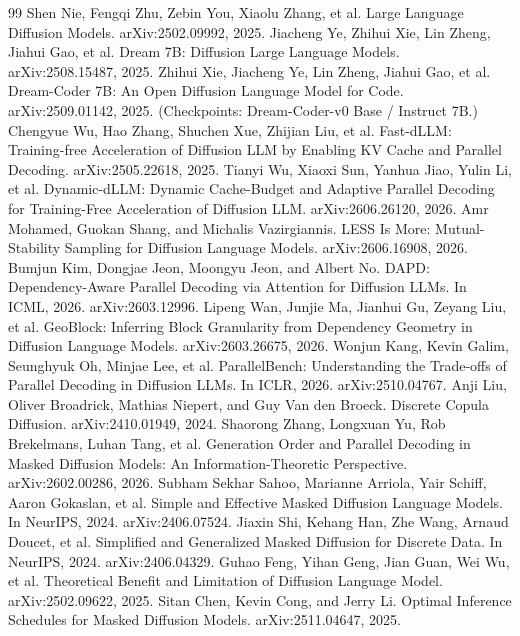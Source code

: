 \begin{thebibliography}{99}
\small
{} Shen Nie, Fengqi Zhu, Zebin You, Xiaolu Zhang, et al. Large Language Diffusion Models. arXiv:2502.09992, 2025.
 Jiacheng Ye, Zhihui Xie, Lin Zheng, Jiahui Gao, et al. Dream 7B: Diffusion Large Language Models. arXiv:2508.15487, 2025.
 Zhihui Xie, Jiacheng Ye, Lin Zheng, Jiahui Gao, et al. Dream-Coder 7B: An Open Diffusion Language Model for Code. arXiv:2509.01142, 2025. (Checkpoints: Dream-Coder-v0 Base / Instruct 7B.)
 Chengyue Wu, Hao Zhang, Shuchen Xue, Zhijian Liu, et al. Fast-dLLM: Training-free Acceleration of Diffusion LLM by Enabling KV Cache and Parallel Decoding. arXiv:2505.22618, 2025.
 Tianyi Wu, Xiaoxi Sun, Yanhua Jiao, Yulin Li, et al. Dynamic-dLLM: Dynamic Cache-Budget and Adaptive Parallel Decoding for Training-Free Acceleration of Diffusion LLM. arXiv:2606.26120, 2026.
 Amr Mohamed, Guokan Shang, and Michalis Vazirgiannis. LESS Is More: Mutual-Stability Sampling for Diffusion Language Models. arXiv:2606.16908, 2026.
 Bumjun Kim, Dongjae Jeon, Moongyu Jeon, and Albert No. DAPD: Dependency-Aware Parallel Decoding via Attention for Diffusion LLMs. In ICML, 2026. arXiv:2603.12996.
 Lipeng Wan, Junjie Ma, Jianhui Gu, Zeyang Liu, et al. GeoBlock: Inferring Block Granularity from Dependency Geometry in Diffusion Language Models. arXiv:2603.26675, 2026.
 Wonjun Kang, Kevin Galim, Seunghyuk Oh, Minjae Lee, et al. ParallelBench: Understanding the Trade-offs of Parallel Decoding in Diffusion LLMs. In ICLR, 2026. arXiv:2510.04767.
 Anji Liu, Oliver Broadrick, Mathias Niepert, and Guy Van den Broeck. Discrete Copula Diffusion. arXiv:2410.01949, 2024.
 Shaorong Zhang, Longxuan Yu, Rob Brekelmans, Luhan Tang, et al. Generation Order and Parallel Decoding in Masked Diffusion Models: An Information-Theoretic Perspective. arXiv:2602.00286, 2026.
 Subham Sekhar Sahoo, Marianne Arriola, Yair Schiff, Aaron Gokaslan, et al. Simple and Effective Masked Diffusion Language Models. In NeurIPS, 2024. arXiv:2406.07524.
 Jiaxin Shi, Kehang Han, Zhe Wang, Arnaud Doucet, et al. Simplified and Generalized Masked Diffusion for Discrete Data. In NeurIPS, 2024. arXiv:2406.04329.
 Guhao Feng, Yihan Geng, Jian Guan, Wei Wu, et al. Theoretical Benefit and Limitation of Diffusion Language Model. arXiv:2502.09622, 2025.
 Sitan Chen, Kevin Cong, and Jerry Li. Optimal Inference Schedules for Masked Diffusion Models. arXiv:2511.04647, 2025.

\end{thebibliography}
